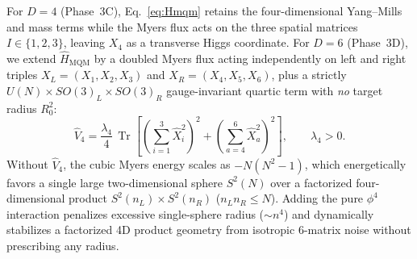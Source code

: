 \documentclass[11pt,a4paper]{article}
\DeclareMathOperator{\Tr}{Tr}
\begin{document}
For $D=4$ (Phase~3C), Eq.~\eqref{eq:Hmqm} retains the four-dimensional Yang--Mills and mass terms while the Myers flux acts on the three spatial matrices $I\in\{1,2,3\}$, leaving $X_4$ as a transverse Higgs coordinate. For $D=6$ (Phase~3D), we extend $\hat{H}_{\mathrm{MQM}}$ by a doubled Myers flux acting independently on left and right triples $X_L = (X_1, X_2, X_3)$ and $X_R = (X_4, X_5, X_6)$, plus a strictly $U(N)\times SO(3)_L \times SO(3)_R$ gauge-invariant quartic term with \emph{no} target radius $R_0^2$:
\begin{equation}
  \hat{V}_{4} = \frac{\lambda_4}{4}\,\Tr\!\left[
    \left(\sum_{i=1}^{3} \hat{X}_i^2\right)^{\!2}
    + \left(\sum_{a=4}^{6} \hat{X}_a^2\right)^{\!2}
  \right], \qquad \lambda_4 > 0.
  \label{eq:V4_6d}
\end{equation}
Without $\hat{V}_4$, the cubic Myers energy scales as $-N(N^2-1)$, which energetically favors a single large two-dimensional sphere $S^2(N)$ over a factorized four-dimensional product $S^2(n_L)\times S^2(n_R)$ ($n_L n_R \le N$). Adding the pure $\phi^4$ interaction penalizes excessive single-sphere radius ($\sim n^4$) and dynamically stabilizes a factorized 4D product geometry from isotropic 6-matrix noise without prescribing any radius.
\end{document}
